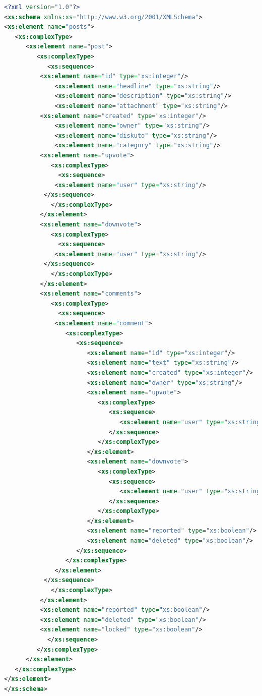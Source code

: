 \documentclass{foi}
\begin{document}
\begin{lstlisting}[language=XML]
 <?xml version="1.0"?>
<xs:schema xmlns:xs="http://www.w3.org/2001/XMLSchema">
<xs:element name="posts">
   <xs:complexType>
      <xs:element name="post">
         <xs:complexType>
            <xs:sequence>
	      <xs:element name="id" type="xs:integer"/>
              <xs:element name="headline" type="xs:string"/>
              <xs:element name="description" type="xs:string"/>
              <xs:element name="attachment" type="xs:string"/>
	      <xs:element name="created" type="xs:integer"/>
              <xs:element name="owner" type="xs:string"/>
              <xs:element name="diskuto" type="xs:string"/>
              <xs:element name="category" type="xs:string"/>
	      <xs:element name="upvote">
	         <xs:complexType>
	           <xs:sequence>
		      <xs:element name="user" type="xs:string"/>
		   </xs:sequence>
	         </xs:complexType>
	      </xs:element>
	      <xs:element name="downvote">
	         <xs:complexType>
	           <xs:sequence>
		      <xs:element name="user" type="xs:string"/>
		   </xs:sequence>
	         </xs:complexType>
	      </xs:element>
	      <xs:element name="comments">
	         <xs:complexType>
	           <xs:sequence>
		      <xs:element name="comment">
		         <xs:complexType>
		            <xs:sequence>
		               <xs:element name="id" type="xs:integer"/>
		               <xs:element name="text" type="xs:string"/>
		               <xs:element name="created" type="xs:integer"/>
		               <xs:element name="owner" type="xs:string"/>
		               <xs:element name="upvote">
		                  <xs:complexType>
		                     <xs:sequence>
		                        <xs:element name="user" type="xs:string"/>
		                     </xs:sequence>
		                  </xs:complexType>
		               </xs:element>
		               <xs:element name="downvote">
		                  <xs:complexType>
		                     <xs:sequence>
		                        <xs:element name="user" type="xs:string"/>
		                     </xs:sequence>
		                  </xs:complexType>
		               </xs:element>
		               <xs:element name="reported" type="xs:boolean"/>
		               <xs:element name="deleted" type="xs:boolean"/>
		            </xs:sequence>
		         </xs:complexType>
		      </xs:element>
		   </xs:sequence>
	         </xs:complexType>
	      </xs:element>
	      <xs:element name="reported" type="xs:boolean"/>
	      <xs:element name="deleted" type="xs:boolean"/>
	      <xs:element name="locked" type="xs:boolean"/>
            </xs:sequence>
         </xs:complexType>
      </xs:element>
   </xs:complexType>
</xs:element>
</xs:schema> 
\end{lstlisting}
\end{document}
